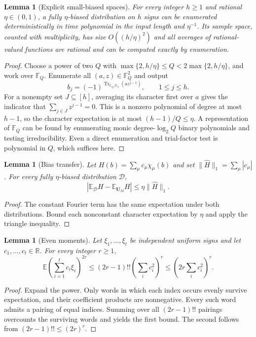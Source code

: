 \documentclass[letterpaper,11pt]{article}
\newtheorem{lemma}[theorem]{Lemma}
\theoremstyle{definition}
\newcommand{\F}{\mathbb F}
\newcommand{\R}{\mathbb R}
\newcommand{\E}{\mathbb E}
\newcommand{\U}{\mathbf U}
\newcommand{\abs}[1]{\left|#1\right|}
\begin{document}
\begin{lemma}[Explicit small-biased spaces]
\label{lem:small-bias}
For every integer $h\ge1$ and rational $\eta\in(0,1)$, a fully
$\eta$-biased distribution on $h$ signs can be enumerated
deterministically in time polynomial in the input length and
$\eta^{-1}$. Its sample
space, counted with multiplicity, has size $O((h/\eta)^2)$ and all
averages of rational-valued functions are rational and can be computed
exactly by enumeration.
\end{lemma}
\begin{proof}
Choose a power of two $Q$ with
$\max\{2,h/\eta\}\le Q<2\max\{2,h/\eta\}$, and work over
$\F_Q$. Enumerate all $(a,z)\in\F_Q^2$ and output
\[
 b_j=(-1)^{\operatorname{Tr}_{\F_Q/\F_2}(az^{j-1})},
 \qquad 1\le j\le h.
\]
For a nonempty set $J\subseteq[h]$, averaging its character first
over $a$ gives the indicator that
$\sum_{j\in J}z^{j-1}=0$. This is a nonzero polynomial of degree
at most $h-1$, so the character expectation is at most
$(h-1)/Q\le\eta$. A representation of $\F_Q$ can be found by
enumerating monic degree-$\log_2Q$ binary polynomials and testing
irreducibility. Even a direct enumeration and trial-factor test is
polynomial in $Q$, which suffices here.
\end{proof}

\begin{lemma}[Bias transfer]
\label{lem:bias-transfer}
Let $H(b)=\sum_\mu c_\mu\chi_\mu(b)$ and set
$\|\widehat H\|_1=\sum_\mu|c_\mu|$. For every fully
$\eta$-biased distribution $\mathcal D$,
\begin{equation}
 \abs{\E_{\mathcal D}H-\E_{\U_M}H}
 \le\eta\|\widehat H\|_1.
 \label{eq:bias-transfer}
\end{equation}
\end{lemma}
\begin{proof}
The constant Fourier term has the same expectation under both
distributions. Bound each nonconstant character expectation by
$\eta$ and apply the triangle inequality.
\end{proof}

\begin{lemma}[Even moments]
\label{lem:moment}
Let $\xi_1,\ldots,\xi_t$ be independent uniform signs and let
$c_1,\ldots,c_t\in\R$. For every integer $r\ge1$,
\begin{equation}
 \E\left(\sum_{i=1}^t c_i\xi_i\right)^{2r}
 \le(2r-1)!!\left(\sum_i c_i^2\right)^r
 \le\left(2r\sum_i c_i^2\right)^r.
 \label{eq:even-moment}
\end{equation}
\end{lemma}
\begin{proof}
Expand the power. Only words in which each index occurs evenly
survive expectation, and their coefficient products are nonnegative.
Every such word admits a pairing of equal indices. Summing over all
$(2r-1)!!$ pairings overcounts the surviving words and yields the
first bound. The second follows from $(2r-1)!!\le(2r)^r$.
\end{proof}
\end{document}
